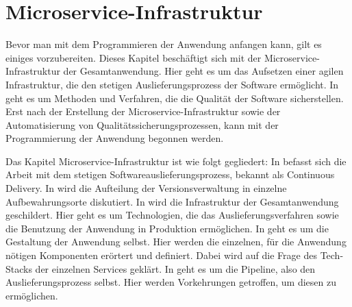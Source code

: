 \chapter{Microservice-Infrastruktur}
\label{chap:microserviceinfrastruktur}
Bevor man mit dem Programmieren der Anwendung anfangen kann,
gilt es einiges vorzubereiten. Dieses Kapitel beschäftigt sich
mit der Microservice-Infrastruktur der Gesamtanwendung. Hier geht
es um das Aufsetzen einer agilen Infrastruktur, die den
stetigen Auslieferungsprozess der Software ermöglicht. 
In  geht es um Methoden und Verfahren,
die die Qualität der Software sicherstellen. Erst nach der Erstellung
der Microservice-Infrastruktur sowie der Automatisierung von
Qualitätssicherungsprozessen, kann mit der Programmierung der
Anwendung begonnen werden.

Das Kapitel Microservice-Infrastruktur ist wie folgt gegliedert:
In  befasst sich die Arbeit mit
dem stetigen Softwareauslieferungsprozess, bekannt als Continuous Delivery.
In  wird die Aufteilung der Versionsverwaltung
in einzelne Aufbewahrungsorte diskutiert. In 
wird die Infrastruktur der Gesamtanwendung geschildert. Hier geht es
um Technologien, die das Auslieferungsverfahren sowie die Benutzung
der Anwendung in Produktion ermöglichen. In 
geht es um die Gestaltung der Anwendung selbst. Hier werden die einzelnen,
für die Anwendung nötigen Komponenten erörtert und definiert. Dabei
wird auf die Frage des Tech-Stacks der einzelnen Services geklärt.
In  geht es um die Pipeline, also den Auslieferungsprozess
selbst. Hier werden Vorkehrungen getroffen, um diesen zu ermöglichen.

